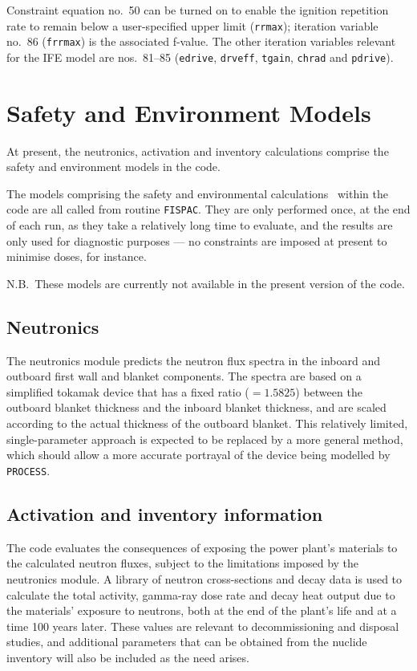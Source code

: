 \documentclass[11pt,a4paper]{report}
\newcommand{\process}{\mbox{\texttt{PROCESS}}}
\begin{document}
Constraint equation no.\ 50 can be turned on to enable the ignition repetition
rate to remain below a user-specified upper limit (\texttt{rrmax}); iteration
variable no.\ 86 (\texttt{frrmax}) is the associated f-value. The other iteration variables relevant for the
IFE model are nos.~81--85 (\texttt{edrive}, \texttt{drveff}, \texttt{tgain},
\texttt{chrad} and \texttt{pdrive}).

\section{Safety and Environment Models}

At present, the neutronics, activation and inventory calculations comprise the
safety and environment models in the code.

The models comprising the safety and environmental calculations~\cite{FISPACT}
within the code are all called from routine \texttt{FISPAC}. They are only
performed once, at the end of each run, as they take a relatively long time to
evaluate, and the results are only used for diagnostic purposes --- no
constraints are imposed at present to minimise doses, for instance.

N.B.\ These models are currently not available in the present version of the
code.

\subsection{Neutronics}

The neutronics module predicts the neutron flux spectra in the inboard and
outboard first wall and blanket components. The spectra are based on a
simplified tokamak device that has a fixed ratio ($=1.5825$) between the
outboard blanket thickness and the inboard blanket thickness, and are scaled
according to the actual thickness of the outboard blanket. This relatively
limited, single-parameter approach is expected to be replaced by a more
general method, which should allow a more accurate portrayal of the device
being modelled by \process.

\subsection{Activation and inventory information}

The code evaluates the consequences of exposing the power plant's materials to
the calculated neutron fluxes, subject to the limitations imposed by the
neutronics module. A library of neutron cross-sections and decay data is used
to calculate the total activity, gamma-ray dose rate and decay heat output due
to the materials' exposure to neutrons, both at the end of the plant's life
and at a time 100 years later. These values are relevant to decommissioning
and disposal studies, and additional parameters that can be obtained from the
nuclide inventory will also be included as the need arises.
\end{document}
